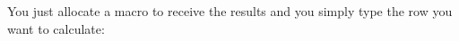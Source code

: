 You just allocate a macro to receive the results and you simply type the row you want to calculate:

\begin{teX}
\begin{center}
  \FPpascal{}\test\\
  \FPpascal{}\test\\
  \FPpascal{}\test\\
  \FPpascal{}\test\\
  \FPpascal{}\test\\
  \FPpascal{}\test\\
  \FPpascal{}\test\\
\end{center}
\end{teX}








